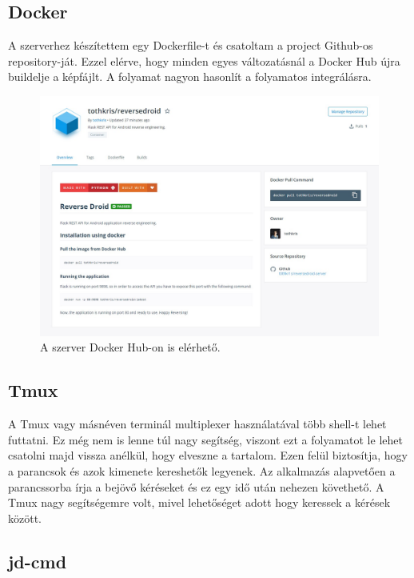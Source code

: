 \documentclass{thesis-ekf}
\theoremstyle{definition}
\theoremstyle{remark}
\begin{document}

\subsection*{Docker}\label{docker}

A szerverhez készítettem egy Dockerfile-t és csatoltam a project Github-os repository-ját.
Ezzel elérve, hogy minden egyes változatásnál a Docker Hub újra buildelje a képfájlt.
A folyamat nagyon hasonlít a folyamatos integrálásra.

\begin{figure}[!h]
	\centering
	\includegraphics[width=15cm]{pictures/docker_hub}
	\caption{A szerver Docker Hub-on is elérhető.}
	\label{dockerhub}
\end{figure}

\subsection*{Tmux}

A Tmux vagy másnéven terminál multiplexer használatával több shell-t lehet futtatni.
Ez még nem is lenne túl nagy segítség, viszont ezt a folyamatot le lehet csatolni majd vissza anélkül, hogy elveszne a tartalom.
Ezen felül biztosítja, hogy a parancsok és azok kimenete kereshetők legyenek.
Az alkalmazás alapvetően a parancssorba írja a bejövő kéréseket és ez egy idő után nehezen követhető.
A Tmux nagy segítségemre volt, mivel lehetőséget adott hogy keressek a kérések között.

\subsection{jd-cmd}
\end{document}
